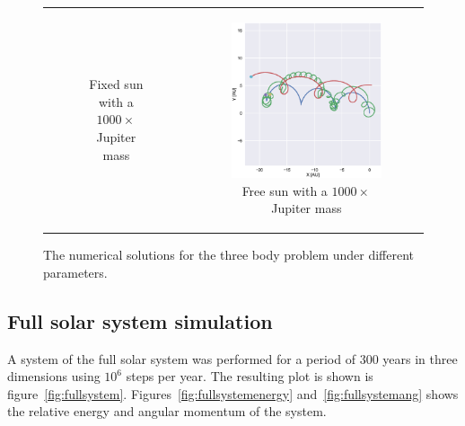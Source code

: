 \documentclass[aps,reprint]{revtex4-1}
\begin{document}
\begin{figure}
\begin{tabular}{cc}
\begin{subfigure}[b]{0.5\columnwidth}
        \caption{Fixed sun with a \(1000\times\) Jupiter mass}
        \label{fix1000}
    \end{subfigure}&
    \begin{subfigure}[b]{0.5\columnwidth}
      \includegraphics[width=\columnwidth]{figures/jupiter2_100.eps}
        \caption{Free sun with a \(1000\times\) Jupiter mass}
        \label{free1000}
    \end{subfigure}\\
    \end{tabular}
    \caption{The numerical solutions for the three body problem under different parameters.}\label{fig:animals}
\end{figure}

\subsection{Full solar system simulation}

A system of the full solar system was performed for a period of \(300\) years in
three dimensions using \(10^{6}\) steps per year. The resulting plot is shown is figure~\ref{fig:fullsystem}.
Figures~\ref{fig:fullsystemenergy} and~\ref{fig:fullsystemang} shows the
relative energy and angular momentum of the system. 
\end{document}
